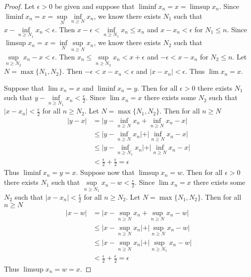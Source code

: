 \documentclass[12pt]{article}
\begin{document}
	\begin{proof}
		Let $\epsilon >0$ be given and suppose that $\liminf{x_n} = x = \limsup{x_n}$. Since $\liminf{x_n} = x = \sup\limits_N \inf\limits_{n \geq N}x_n$, we know there exists $N_1$ such that \\$x - \inf\limits_{n \geq N_1} x_n < \epsilon$. Then $x - \epsilon < \inf\limits_{n \geq N_1} x_n \leq x_n$ and $x - x_n < \epsilon$ for $N_1 \leq n$. Since $\limsup{x_n} = x = \inf\limits_N \sup\limits_{n \geq N}x_n$, we know there exists $N_2$ such that \\$\sup\limits_{n \geq N_2} x_n - x < \epsilon$. Then $x_n \leq \sup\limits_{n \geq N_2}x_n < x + \epsilon$ and $-\epsilon < x - x_n$ for $N_2 \leq n$. Let $N = \max\{N_1,N_2\}$. Then $-\epsilon < x - x_n < \epsilon$ and $\vert x - x_n \vert < \epsilon$. Thus $\lim x_n = x$. \bigbreak
		
		Suppose that $\lim x_n = x$ and $\liminf x_n = y$. Then for all $\epsilon > 0$ there exists $N_1$ such that $y -  \inf\limits_{n \geq N_1}x_n < \tfrac{\epsilon}{2}$. Since $\lim x_n = x$ there exists some $N_2$ such that $\vert x - x_n \vert < \tfrac{\epsilon}{2}$ for all $n \geq N_2$. Let $N = \max\{N_1,N_2\}$. Then for all $n \geq N$
		\begin{align*}
			\vert y - x \vert & = \vert y - \inf\limits_{n \geq N}x_n + \inf\limits_{n \geq N}x_n - x \vert \\
			& \leq \vert y - \inf\limits_{n \geq N}x_n \vert + \vert \inf\limits_{n \geq N}x_n - x \vert \\
			& \leq \vert y - \inf\limits_{n \geq N_1}x_n \vert + \vert \inf\limits_{n \geq N}x_n - x \vert \\
			& < \tfrac{\epsilon}{2} + \tfrac{\epsilon}{2} = \epsilon
		\end{align*}
		Thus $\liminf x_n = y = x$. \bigbreak
		Suppose now that $\limsup x_n = w$. Then for all $\epsilon > 0$ there exists $N_1$ such that $\sup\limits_{n \geq N_1}x_n - w < \tfrac{\epsilon}{2}$. Since $\lim x_n = x$ there exists some $N_2$ such that $\vert x - x_n \vert < \tfrac{\epsilon}{2}$ for all $n \geq N_2$. Let $N = \max\{N_1,N_2\}$. Then for all $n \geq N$
		\begin{align*}
			\vert x - w \vert & = \vert x - \sup\limits_{n \geq N}x_n + \sup\limits_{n \geq N}x_n - w \vert \\
			& \leq \vert x - \sup\limits_{n \geq N}x_n \vert + \vert \sup\limits_{n \geq N}x_n - w \vert \\
			& \leq \vert x - \sup\limits_{n \geq N}x_n \vert + \vert \sup\limits_{n \geq N_1}x_n - w \vert \\
			& < \tfrac{\epsilon}{2} + \tfrac{\epsilon}{2} = \epsilon
		\end{align*}
		Thus $\limsup x_n = w = x$. \bigbreak
	\end{proof}
\end{document}
